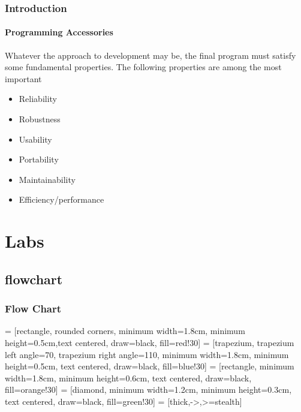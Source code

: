 \documentclass[hyperref={pdfpagelabels=true}]{beamer}
\newcounter{angle}
\begin{document}
\begin{frame}
\frametitle{Introduction}
\framesubtitle{Programming Accessories}
Whatever the approach to development may be, the final program must satisfy some fundamental properties. The following properties are among the most important
\begin{itemize}
\item[\ding{90}] Reliability
\item[\ding{90}] Robustness
\item[\ding{90}] Usability
\item[\ding{90}] Portability
\item[\ding{90}] Maintainability
\item[\ding{90}] Efficiency/performance
\end{itemize}
\end{frame}


\section{Labs}



\subsection{flowchart}

\begin{frame}[shrink]
\frametitle{Flow Chart}
\centering
{} = [rectangle, rounded corners, minimum width=1.8cm, minimum height=0.5cm,text centered, draw=black, fill=red!30]
 = [trapezium, trapezium left angle=70, trapezium right angle=110, minimum width=1.8cm, minimum height=0.5cm, text centered, draw=black, fill=blue!30]
 = [rectangle, minimum width=1.8cm, minimum height=0.6cm, text centered, draw=black, fill=orange!30]
 = [diamond, minimum width=1.2cm, minimum height=0.3cm, text centered, draw=black, fill=green!30]
 = [thick,->,>=stealth]
\begin{center}
\tiny{
}
\end{center}
\end{frame}
\end{document}
